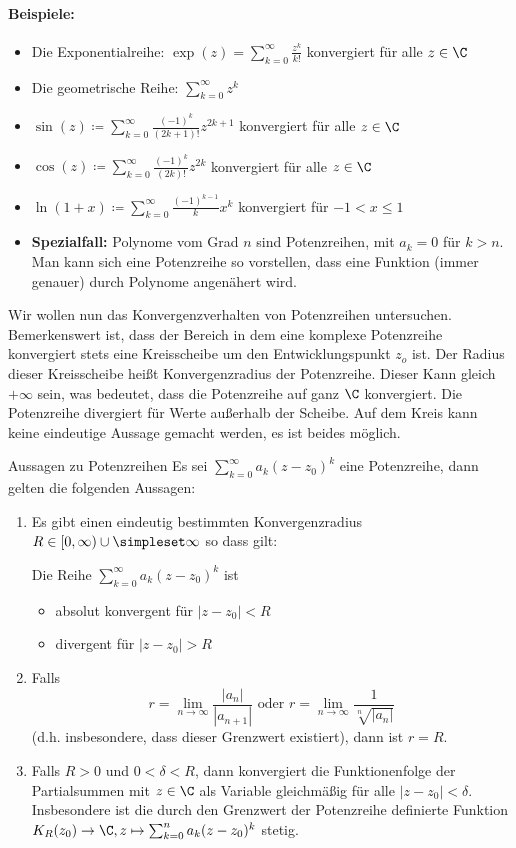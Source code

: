 \paragraph{Beispiele:}
\begin{itemize}
	\item Die Exponentialreihe: $\exp(z)=\sum\limits_{k=0}^\infty \frac{z^k}{k!}$ konvergiert für alle $z\in\C$
	\item Die geometrische Reihe: $\sum\limits_{k=0}^\infty z^k$
	\item $\sin(z)\coloneqq\sum\limits_{k=0}^\infty \frac{(-1)^{k}}{(2k+1)!}z^{2k+1}$ konvergiert für alle $z\in\C$
	\item $\cos(z)\coloneqq\sum\limits_{k=0}^\infty \frac{(-1)^{k}}{(2k)!}z^{2k}$ konvergiert für alle $z\in\C$
	\item $\ln(1+x)\coloneqq\sum\limits_{k=0}^\infty \frac{(-1)^{k-1}}{k}x^{k}$ konvergiert für $-1<x\leq 1$
	\item \textbf{Spezialfall:} Polynome vom Grad $n$ sind Potenzreihen, mit $a_k=0$ für $k>n$.
	Man kann sich eine Potenzreihe so vorstellen, dass eine Funktion (immer genauer) durch Polynome angenähert wird.
\end{itemize}
Wir wollen nun das Konvergenzverhalten von Potenzreihen untersuchen. Bemerkenswert ist, dass der Bereich in dem eine komplexe Potenzreihe konvergiert stets eine Kreisscheibe um den Entwicklungspunkt $z_o$ ist. Der Radius dieser Kreisscheibe heißt Konvergenzradius der Potenzreihe. Dieser Kann gleich $+\infty$ sein, was bedeutet, dass die Potenzreihe auf ganz $\C$ konvergiert. Die Potenzreihe divergiert für Werte außerhalb der Scheibe. Auf dem Kreis kann keine eindeutige Aussage gemacht werden, es ist beides möglich.

\begin{satz}{Aussagen zu Potenzreihen}
	Es sei $\sum\limits_{k=0}^\infty a_k(z-z_0)^k$ eine Potenzreihe, dann gelten die folgenden Aussagen:
	\begin{enumerate}
		\item Es gibt einen eindeutig bestimmten Konvergenzradius $R\in[0,\infty)\cup\simpleset\infty$ so dass gilt:

		Die Reihe $\sum\limits_{k=0}^\infty a_k(z-z_0)^k$ ist
		\begin{itemize}
			\item absolut konvergent für $|z-z_0|<R$
			\item divergent für $|z-z_0|>R$
		\end{itemize}
		\item Falls
		\begin{equation*}
			r=\lim\limits_{n\to\infty}\frac{|a_n|}{|a_{n+1}|} \text{ oder }r=\lim\limits_{n\to\infty}\frac{1}{\sqrt[n]{|a_n|}}
		\end{equation*}
		(d.h. insbesondere, dass dieser Grenzwert existiert), dann ist $r=R$.
		\item Falls $R>0$ und $0<\delta<R$, dann konvergiert die Funktionenfolge der Partialsummen mit $z\in\C$ als Variable gleichmäßig für alle $|z-z_0|<\delta$. Insbesondere ist die durch den Grenzwert der Potenzreihe definierte Funktion $K_R(z_0)\rightarrow \C, z\mapsto\sum_{k=0}^n a_k(z-z_0)^k$ stetig.
	\end{enumerate}
\end{satz}
